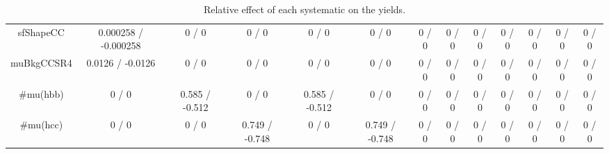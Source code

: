 \documentclass[10pt]{article}
\begin{document}
\begin{table}[htbp]
\begin{center}
\begin{tabular}{|c|c|c|c|c|c|c|c|c|c|c|c|c|}
  sfShapeCC & 0.000258 / -0.000258 & 0 / 0 & 0 / 0 & 0 / 0 & 0 / 0 & 0 / 0 & 0 / 0 & 0 / 0 & 0 / 0 & 0 / 0 & 0 / 0 & 0 / 0 \\ 
  muBkgCCSR4 & 0.0126 / -0.0126 & 0 / 0 & 0 / 0 & 0 / 0 & 0 / 0 & 0 / 0 & 0 / 0 & 0 / 0 & 0 / 0 & 0 / 0 & 0 / 0 & 0 / 0 \\ 
  #mu(hbb) & 0 / 0 & 0.585 / -0.512 & 0 / 0 & 0.585 / -0.512 & 0 / 0 & 0 / 0 & 0 / 0 & 0 / 0 & 0 / 0 & 0 / 0 & 0 / 0 & 0 / 0 \\ 
  #mu(hcc) & 0 / 0 & 0 / 0 & 0.749 / -0.748 & 0 / 0 & 0.749 / -0.748 & 0 / 0 & 0 / 0 & 0 / 0 & 0 / 0 & 0 / 0 & 0 / 0 & 0 / 0 \\ 
\hline 
\end{tabular} 
\caption{Relative effect of each systematic on the yields.} 
\end{center} 
\end{table} 
\end{document}
